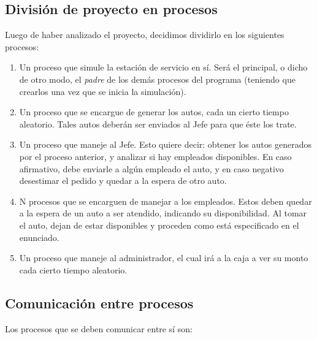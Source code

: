 \documentclass[a4paper,12pt]{article}
\begin{document}
\subsection{División de proyecto en procesos}
Luego de haber analizado el proyecto, decidimos dividirlo en los siguientes procesos:
\begin{enumerate}
\item Un proceso que simule la estación de servicio en sí. Será el principal, o dicho de otro modo, el \textit{padre} de los demás procesos del programa (teniendo que crearlos una vez que se inicia la simulación).
\item Un proceso que se encargue de generar los autos, cada un cierto tiempo aleatorio. Tales autos deberán ser enviados al Jefe para que éste los trate.
\item Un proceso que maneje al Jefe. Esto quiere decir: obtener los autos generados por el proceso anterior, y analizar si hay empleados disponibles. En caso afirmativo, debe enviarle a algún empleado el auto, y en caso negativo desestimar el 	pedido y quedar a la espera de otro auto.
\item N procesos que se encarguen de manejar a los empleados. Estos deben quedar a la espera de un auto a ser atendido, indicando su disponibilidad. Al tomar el auto, dejan de estar disponibles y proceden como está especificado en el enunciado. 
\item Un proceso que maneje al administrador, el cual irá a la caja a ver su monto cada cierto tiempo aleatorio.
\end{enumerate}


\subsection{Comunicación entre procesos}
Los procesos que se deben comunicar entre sí son:
\end{document}
